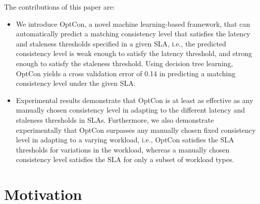 \documentclass[conference]{IEEEtran}
\begin{document}
 The contributions of this paper are: \begin{itemize}
  \item We introduce OptCon, a novel machine learning-based framework, that can automatically predict a
   matching consistency level that satisfies the latency and staleness thresholds specified in a given SLA, i.e., the predicted consistency level is weak enough to satisfy the latency
   threshold, and strong enough to satisfy the staleness threshold. Using decision tree learning, OptCon yields a cross validation error of 0.14
in predicting a matching consistency level under the given SLA.
\item  Experimental results demonstrate that OptCon is at least as effective as any manually chosen
   consistency level in adapting to the different latency and staleness thresholds in SLAs.
  Furthermore, we also demonstrate experimentally that OptCon surpasses any manually chosen fixed consistency level in adapting to a varying workload,
   i.e., OptCon satisfies the SLA thresholds for variations in the workload, whereas a manually chosen consistency
   level satisfies the SLA for only a subset of workload types.
  \end{itemize}

  \section{Motivation} \label{sec:parameters}
\end{document}
